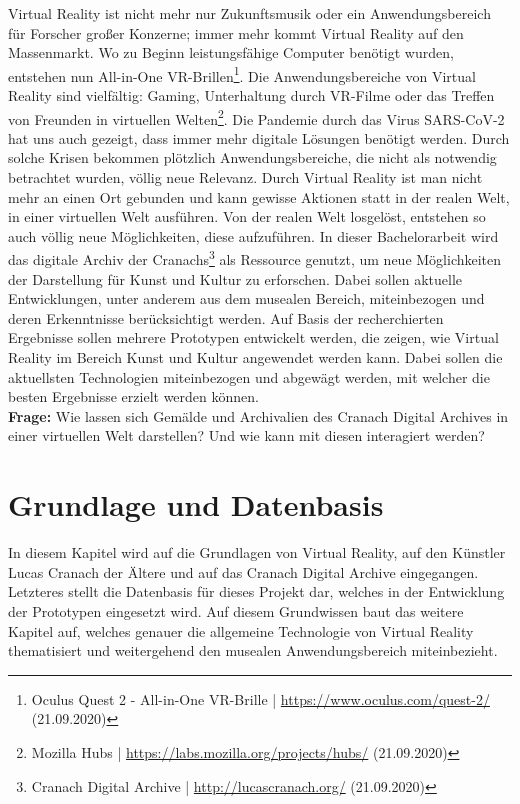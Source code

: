 \documentclass[a4paper,12pt,oneside]{article}
\begin{document}
    Virtual Reality ist nicht mehr nur Zukunftsmusik oder ein Anwendungsbereich für Forscher
    großer Konzerne; immer mehr kommt Virtual Reality auf den Massenmarkt. Wo zu Beginn
    leistungsfähige Computer benötigt wurden, entstehen nun All-in-One VR-Brillen\footnote{Oculus Quest 2 - All-in-One VR-Brille | \url{https://www.oculus.com/quest-2/} (21.09.2020)}.
    Die Anwendungsbereiche von Virtual Reality sind vielfältig: Gaming, Unterhaltung durch VR-Filme oder
    das Treffen von Freunden in virtuellen Welten\footnote{Mozilla Hubs | \url{https://labs.mozilla.org/projects/hubs/} (21.09.2020)}.
    Die Pandemie durch das Virus SARS-CoV-2 hat uns auch gezeigt, dass immer mehr digitale Lösungen
    benötigt werden. Durch solche Krisen bekommen plötzlich Anwendungsbereiche, die nicht als
    notwendig betrachtet wurden, völlig neue Relevanz.
    Durch Virtual Reality ist man nicht mehr an einen Ort gebunden und kann gewisse Aktionen
    statt in der realen Welt, in einer virtuellen Welt ausführen. Von der realen Welt
    losgelöst, entstehen so auch völlig neue Möglichkeiten, diese aufzuführen.
    In dieser Bachelorarbeit wird das digitale Archiv der Cranachs\footnote{Cranach Digital Archive | \url{http://lucascranach.org/} (21.09.2020)}
    als Ressource genutzt, um neue Möglichkeiten der Darstellung für Kunst und Kultur zu erforschen.
    Dabei sollen aktuelle Entwicklungen, unter anderem aus dem musealen Bereich, miteinbezogen 
    und deren Erkenntnisse berücksichtigt werden.
    Auf Basis der recherchierten Ergebnisse sollen mehrere Prototypen entwickelt werden,
    die zeigen, wie Virtual Reality im Bereich Kunst und Kultur angewendet werden kann. 
    Dabei sollen die
    aktuellsten Technologien miteinbezogen und abgewägt werden, mit welcher die
    besten Ergebnisse erzielt werden können.  \\
    \textbf{Frage:} Wie lassen sich Gemälde und Archivalien des Cranach Digital
    Archives in einer virtuellen Welt darstellen? Und wie kann mit diesen
    interagiert werden?

  \section{Grundlage und Datenbasis}
    In diesem Kapitel wird auf die Grundlagen von Virtual Reality, auf den Künstler Lucas Cranach 
    der Ältere und auf das Cranach Digital Archive eingegangen. Letzteres stellt 
    die Datenbasis für dieses Projekt dar, welches in der Entwicklung der Prototypen 
    eingesetzt wird. 
    Auf diesem Grundwissen baut das weitere Kapitel auf, welches genauer 
    die allgemeine Technologie von Virtual Reality thematisiert und weitergehend
    den musealen Anwendungsbereich miteinbezieht.
\end{document}
